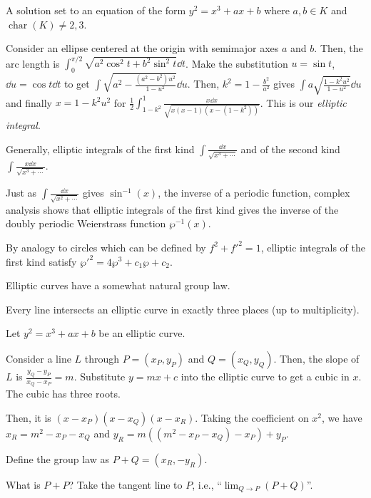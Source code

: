 \documentclass[notes]{agony}
\begin{document}
\begin{defn}
  A solution set to an equation of the form $y^2 = x^3 + ax + b$
  where $a,b \in K$ and $\operatorname{char}(K) \neq 2,3$.
\end{defn}

Consider an ellipse centered at the origin with semimajor axes $a$ and $b$.
Then, the arc length is $\int_0^{\pi/2}\sqrt{a^2\cos^2t + b^2\sin^2t} \dd{t}$.
Make the substitution $u = \sin t$, $\dd{u} = \cos t \dd{t}$ to get
$\int \sqrt{a^2 - \frac{(a^2-b^2)u^2}{1-u^2}} \dd{u}$.
Then, $k^2 = 1-\frac{b^2}{a^2}$ gives $\int a\sqrt{\frac{1-k^2u^2}{1-u^2}}\dd{u}$
and finally $x = 1-k^2u^2$ for $\frac12\int_{1-k^2}^1\frac{x\dd{x}}{\sqrt{x(x-1)(x-(1-k^2))}}$.
This is our \emph{elliptic integral}.

Generally, elliptic integrals of the first kind $\int \frac{\dd{x}}{\sqrt{x^3+\dotsb}}$
and of the second kind $\int \frac{x\dd{x}}{\sqrt{x^3+\dotsb}}$.

Just as $\int \frac{\dd{x}}{\sqrt{x^2 + \dotsb}}$ gives $\sin^{-1}(x)$,
the inverse of a periodic function, complex analysis shows that
elliptic integrals of the first kind gives the inverse of the doubly periodic
Weierstrass function $\wp^{-1}(x)$.

By analogy to circles which can be defined by $f^2 + f'^2 = 1$,
elliptic integrals of the first kind satisfy $\wp'^2 = 4\wp^3 + c_1\wp + c_2$.

Elliptic curves have a somewhat natural group law.

\begin{lemma}
  Every line intersects an elliptic curve in exactly three places
  (up to multiplicity).
\end{lemma}
\begin{prf}
  Let $y^2 = x^3 + ax + b$ be an elliptic curve.

  Consider a line $L$ through $P = (x_P, y_P)$ and $Q = (x_Q, y_Q)$.
  Then, the slope of $L$ is $\frac{y_Q-y_P}{x_Q-x_P} = m$.
  Substitute $y = mx + c$ into the elliptic curve to get a cubic in $x$.
  The cubic has three roots.

  Then, it is $(x-x_P)(x-x_Q)(x-x_R)$.
  Taking the coefficient on $x^2$, we have $x_R = m^2 - x_P - x_Q$
  and $y_R = m((m^2-x_P-x_Q)-x_P)+y_P$.
\end{prf}

Define the group law as $P + Q = (x_R, -y_R)$.

What is $P+P$? Take the tangent line to $P$, i.e., ``$\lim_{Q \to P}(P+Q)$''.
\end{document}
